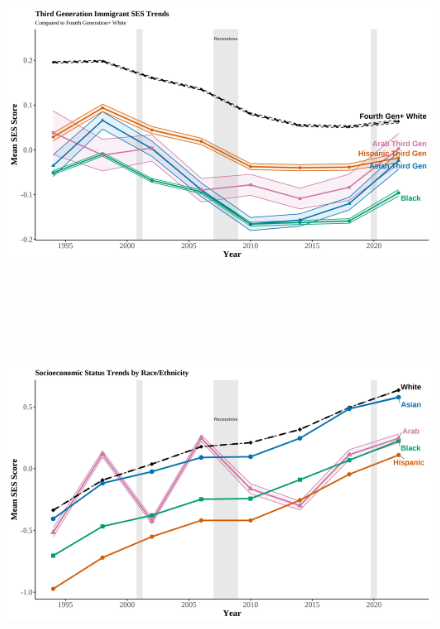 \clearpage

\begin{center}
    \begin{figure}[H]
    \caption{}
    \includegraphics[width=\textwidth, height=9cm]{figure/06-SES-thirdgens.png} 
    \label{fig:diag}
    \caption*{\footnotesize{}}
    \end{figure}
    \hfill%
\end{center}


\clearpage

\begin{center}
    \begin{figure}[H]
    \caption{}
    \includegraphics[width=\textwidth, height=9cm]{figure/07-SES-selfreport-race-ethn.png} 
    \label{fig:diag}
    \caption*{\footnotesize{}}
    \end{figure}
    \hfill%
\end{center}

